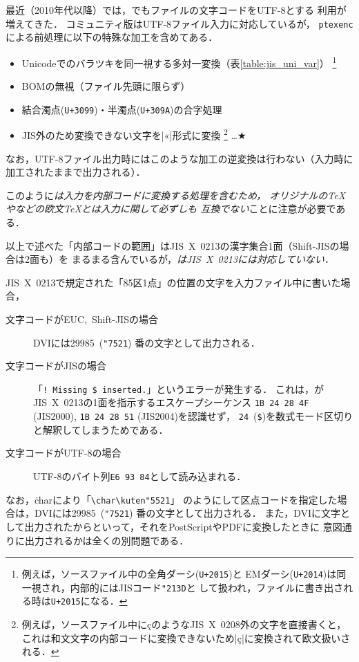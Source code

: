 \documentclass[a4paper,11pt,nomag,dvipdfmx]{jsarticle}
\def\code#1{\texttt{#1}}
\begin{document}
最近（2010年代以降）では，\pTeX でもファイルの文字コードをUTF-8とする
利用が増えてきた．
コミュニティ版\pTeX はUTF-8ファイル入力に対応しているが，
\code{ptexenc}による前処理に以下の特殊な加工を含めてある．
\begin{itemize}
 \item Unicodeでのバラツキを同一視する多対一変換（表\ref{table:jis_uni_var}）
  \footnote{例えば，ソースファイル中の全角ダーシ(\code{U+2015})と
  EMダーシ(\code{U+2014})は同一視され，内部的にはJISコード\code{"213D}と
  して扱われ，ファイルに書き出される時は\code{U+2015}になる．}
 \item BOMの無視（ファイル先頭に限らず）
 \item 結合濁点(\code{U+3099})・半濁点(\code{U+309A})の合字処理
 \item JIS外のため変換できない文字を|^^ab|形式に変換
  \footnote{例えば，ソースファイル中にçのようなJIS~X~0208外の文字を直接書くと，
  これは和文文字の内部コードに変換できないため|ç|に変換されて欧文扱いされる．}%
  …★
\end{itemize}
なお，UTF-8ファイル出力時にはこのような加工の逆変換は行わない（入力時に
加工されたままで出力される）．

このように\emph{\pTeX は入力を内部コードに変換する処理を含むため，
オリジナルの\TeX や\pdfTeX などの欧文\TeX とは入力に関して必ずしも
互換でない}ことに注意が必要である．

\begin{dangerous}
 以上で述べた「内部コードの範囲」はJIS~X~0213の漢字集合1面（Shift-JISの場合は2面も）を
 まるまる含んでいるが，\emph{\pTeX はJIS~X~0213には対応していない．}

 JIS~X~0213で規定された「85区1点」の位置の文字を入力ファイル中に書いた場合，
 \begin{description}
  \item[文字コードがEUC,~Shift-JISの場合] DVIには29985~(\texttt{"7521})%
    番の文字として出力される．
  \item[文字コードがJISの場合] 「\verb+! Missing $ inserted.+」というエラーが発生する．
    これは，\pTeX がJIS~X~0213の1面を指示するエスケープシーケンス
    \texttt{1B 24 28 4F} (JIS2000), \texttt{1B 24 28 51} (JIS2004)を認識せず，
    \texttt{24}~(\texttt{\$})を数式モード区切りと解釈してしまうためである．
  \item[文字コードがUTF-8の場合] UTF-8のバイト列\texttt{E6 93 84}として読み込まれる．
 \end{description}
 なお，\.{char}により「\verb+\char\kuten"5521+」%
 のようにして区点コードを指定した場合は，DVIには29985~(\texttt{"7521})%
 番の文字として出力される．
 また，DVIに文字として出力されたからといって，それをPostScriptやPDFに変換したときに
 意図通りに出力されるかは全くの別問題である．
\end{dangerous}
\end{document}
